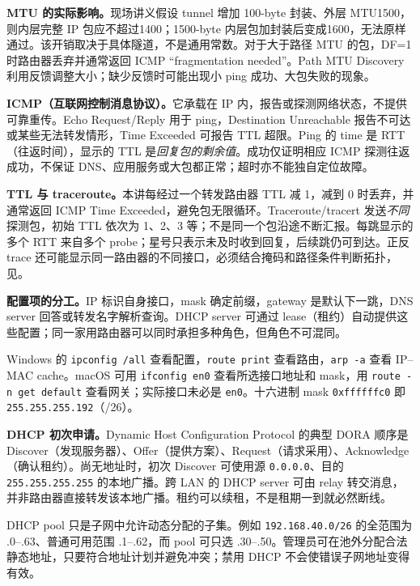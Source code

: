 \textbf{MTU 的实际影响。}现场讲义假设 tunnel 增加 100-byte 封装、外层 MTU1500，则内层完整 IP 包应不超过1400；1500-byte 内层包加封装后变成1600，无法原样通过。该开销取决于具体隧道，不是通用常数。对于大于路径 MTU 的包，DF=1 时路由器丢弃并通常返回 ICMP ``fragmentation needed''。Path MTU Discovery 利用反馈调整大小；缺少反馈时可能出现小 ping 成功、大包失败的现象。

\textbf{ICMP（互联网控制消息协议）。}它承载在 IP 内，报告或探测网络状态，不提供可靠重传。Echo Request/Reply 用于 ping，Destination Unreachable 报告不可达或某些无法转发情形，Time Exceeded 可报告 TTL 超限。Ping 的 time 是 RTT（往返时间），显示的 TTL 是\emph{回复包的剩余值}。成功仅证明相应 ICMP 探测往返成功，不保证 DNS、应用服务或大包都正常；超时亦不能独自定位故障。

\textbf{TTL 与 traceroute。}本讲每经过一个转发路由器 TTL 减 1，减到 0 时丢弃，并通常返回 ICMP Time Exceeded，避免包无限循环。Traceroute/tracert 发送\emph{不同}探测包，初始 TTL 依次为 1、2、3 等；不是同一个包沿途不断汇报。每跳显示的多个 RTT 来自多个 probe；星号只表示未及时收到回复，后续跳仍可到达。正反 trace 还可能显示同一路由器的不同接口，必须结合掩码和路径条件判断拓扑，见。


\textbf{配置项的分工。}IP 标识自身接口，mask 确定前缀，gateway 是默认下一跳，DNS server 回答或转发名字解析查询。DHCP server 可通过 lease（租约）自动提供这些配置；同一家用路由器可以同时承担多种角色，但角色不可混同。

Windows 的 \texttt{ipconfig /all} 查看配置，\texttt{route print} 查看路由，\texttt{arp -a} 查看 IP--MAC cache。macOS 可用 \texttt{ifconfig en0} 查看所选接口地址和 mask，用 \texttt{route -n get default} 查看网关；实际接口未必是 \texttt{en0}。十六进制 mask \texttt{0xffffffc0} 即 \texttt{255.255.255.192}（/26）。

\textbf{DHCP 初次申请。}Dynamic Host Configuration Protocol 的典型 DORA 顺序是 Discover（发现服务器）、Offer（提供方案）、Request（请求采用）、Acknowledge（确认租约）。尚无地址时，初次 Discover 可使用源 \texttt{0.0.0.0}、目的 \texttt{255.255.255.255} 的本地广播。跨 LAN 的 DHCP server 可由 relay 转交消息，并非路由器直接转发该本地广播。租约可以续租，不是租期一到就必然断线。

DHCP pool 只是子网中允许动态分配的子集。例如 \texttt{192.168.40.0/26} 的全范围为 .0--.63、普通可用范围 .1--.62，而 pool 可只选 .30--.50。管理员可在池外分配合法静态地址，只要符合地址计划并避免冲突；禁用 DHCP 不会使错误子网地址变得有效。

